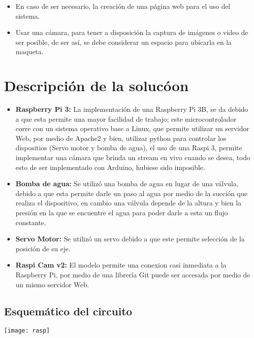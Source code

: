 \documentclass[12pt,letterpaper]{IEEEtran}
\begin{document}
\begin{itemize}
	\item En caso de ser necesario, la creación de una página web para el uso del sistema.
	\item Usar una cámara, para tener a disposición la captura de imágenes o video de ser posible, de ser así, se debe considerar un espacio para ubicarla en la maqueta.
\end{itemize}

\section{Descripción de la solucóon}

\begin{itemize}

\item\textbf{Raspberry Pi 3:} La implementación de una Raspberry Pi 3B, se da debido a que esta permite una mayor facilidad de trabajo; este microcontrolador corre con un sistema operativo base a Linux, que permite utilizar un servidor Web, por medio de Apache2 y bien, utilizar python para controlar los dispositios (Servo motor y bomba de agua), el uso de una Raspi 3, permite implementar una cámara que brinda un stream en vivo cuando se desea, todo esto de ser implementado con Arduino, hubiese sido imposible.\\

\item\textbf{Bomba de agua:} Se utilizó una bomba de agua en lugar de una válvula, debido a que esta  permite darle un paso al agua por medio de la succión que realiza el dispositivo, en cambio una válvula depende de la altura y bien la presión en la que se encuentre el agua para poder darle a esta un flujo constante.\\

\item\textbf{Servo Motor:} Se utilizó un servo debido a que este permite selección de la posición de su eje.\\

\item\textbf{Raspi Cam v2:} El modelo permite una conexion casi inmediata a la Raspberry Pi, por medio de una librería Git puede ser accesada por medio de un mismo servidor Web. \\

\end{itemize}

\subsection{Esquemático del circuito}
\texttt{[image: rasp]}
\end{document}
